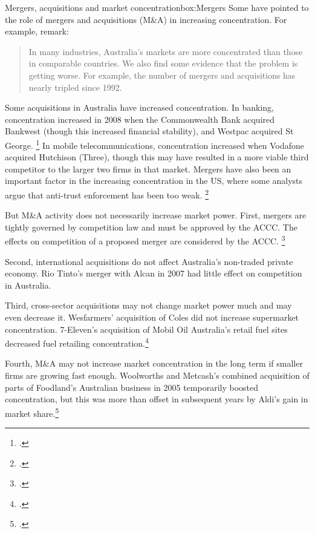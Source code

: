 \begin{bigbox}{Mergers, acquisitions and market concentration}{box:Mergers}
Some have pointed to the role of mergers and acquisitions (M\&A) in increasing concentration. For example, \textcite{Leigh-Triggs-Huff-2017} remark:

\begin{quote}
    In many industries, Australia's markets are more concentrated than those in comparable countries. We also find some evidence that the problem is getting worse. For example, the number of mergers and acquisitions has nearly tripled since 1992.
\end{quote}  


Some acquisitions in Australia have increased concentration. In banking, concentration increased in 2008 when the Commonwealth Bank acquired Bankwest (though this increased financial stability), and Westpac acquired St George.%
\footcite{APRA2017MonthlyBankingStatistics}
In mobile telecommunications, concentration increased when Vodafone acquired Hutchison (Three), though this may have resulted in a more viable third competitor to the larger two firms in that market. Mergers have also been an important factor in the increasing concentration in the US, where some analysts argue that anti-trust enforcement has been too weak.%
\footcite{antitrustpopulism}

But M\&A activity does not necessarily increase market power.
First, mergers are tightly governed by competition law and must be approved by the ACCC\@. The effects on competition of a proposed merger are considered by the ACCC\@.%
\footcite{ACCC_mergerguidelines}

Second, international acquisitions do not affect Australia's non-traded private economy.
Rio Tinto's merger with Alcan in 2007 had little effect on competition in Australia.

Third, cross-sector acquisitions may not change market power much and may even decrease it. Wesfarmers' acquisition of Coles did not increase supermarket concentration. 7-Eleven's acquisition of Mobil Oil Australia's retail fuel sites decreased fuel retailing concentration.\footcite{7eleven_divestment}

Fourth, M\&A may not increase market concentration in the long term if smaller firms are growing fast enough. Woolworths and Metcash's combined acquisition of parts of Foodland's Australian business in 2005 temporarily boosted concentration, but this was more than offset in subsequent years by Aldi's gain in market share.\footcite{FT_Foodland_2005}


\end{bigbox}

